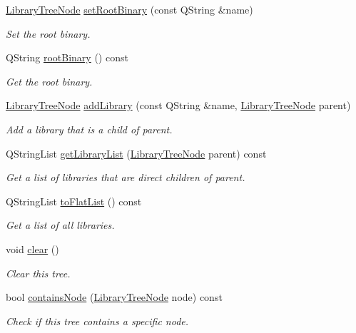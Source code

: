 \begin{DoxyCompactItemize}
\item 
\hyperlink{class_mdt_1_1_deploy_utils_1_1_library_tree_node}{Library\+Tree\+Node} \hyperlink{class_mdt_1_1_deploy_utils_1_1_library_tree_ab11aef58e0492638f23169073820ffac}{set\+Root\+Binary} (const Q\+String \&name)
\begin{DoxyCompactList}\small\item\em Set the root binary. \end{DoxyCompactList}\item 
Q\+String \hyperlink{class_mdt_1_1_deploy_utils_1_1_library_tree_ac58cd1beebbbb7c8b1606670e38d2a69}{root\+Binary} () const 
\begin{DoxyCompactList}\small\item\em Get the root binary. \end{DoxyCompactList}\item 
\hyperlink{class_mdt_1_1_deploy_utils_1_1_library_tree_node}{Library\+Tree\+Node} \hyperlink{class_mdt_1_1_deploy_utils_1_1_library_tree_aed0a4f339a65e462a578e00231cf522c}{add\+Library} (const Q\+String \&name, \hyperlink{class_mdt_1_1_deploy_utils_1_1_library_tree_node}{Library\+Tree\+Node} parent)
\begin{DoxyCompactList}\small\item\em Add a library that is a child of {\itshape parent}. \end{DoxyCompactList}\item 
Q\+String\+List \hyperlink{class_mdt_1_1_deploy_utils_1_1_library_tree_a150df5c2a8a9a05c38e3172b9a4a4f21}{get\+Library\+List} (\hyperlink{class_mdt_1_1_deploy_utils_1_1_library_tree_node}{Library\+Tree\+Node} parent) const 
\begin{DoxyCompactList}\small\item\em Get a list of libraries that are direct children of {\itshape parent}. \end{DoxyCompactList}\item 
Q\+String\+List \hyperlink{class_mdt_1_1_deploy_utils_1_1_library_tree_a7ee09eb33f1f392b66017d3ab7475f53}{to\+Flat\+List} () const 
\begin{DoxyCompactList}\small\item\em Get a list of all libraries. \end{DoxyCompactList}\item 
void \hyperlink{class_mdt_1_1_deploy_utils_1_1_library_tree_a1035b22adbe9c119339ce83a33ed8eba}{clear} ()
\begin{DoxyCompactList}\small\item\em Clear this tree. \end{DoxyCompactList}\item 
bool \hyperlink{class_mdt_1_1_deploy_utils_1_1_library_tree_a87fc3fa448d541cc97e6dd31f6288376}{contains\+Node} (\hyperlink{class_mdt_1_1_deploy_utils_1_1_library_tree_node}{Library\+Tree\+Node} node) const 
\begin{DoxyCompactList}\small\item\em Check if this tree contains a specific node. \end{DoxyCompactList}\end{DoxyCompactItemize}


